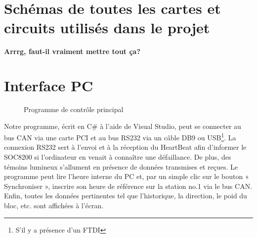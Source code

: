 \documentclass[10pt,a4paper,final]{article}
\begin{document}
\begin{spacing}{1.5}



\pagebreak
\section{Schémas de toutes les cartes et circuits utilisés dans le projet}

\textbf{{\Huge Arrrg, faut-il vraiment mettre tout ça?}}

\pagebreak
  
 

\section{Interface PC}

\begin{figure}[hbtp]
\caption{Programme de contrôle principal}
\centering
{}
\end{figure}

Notre programme, écrit en C\# à l'aide de Visual Studio, peut se connecter au bus CAN via une carte PCI et au bus RS232 via un câble DB9 ou USB\footnote{S'il y a présence d'un FTDI}. La connexion RS232 sert à l'envoi et à la réception du HeartBeat afin d'informer le SOC8200 si l'ordinateur en venait à connaître une défaillance. De plus, des témoins lumineux s'allument en présence de données transmises et reçues. Le programme peut lire l'heure interne du PC et, par un simple clic sur le bouton « Synchroniser », inscrire son heure de référence sur la station no.1 via le bus CAN. Enfin, toutes les données pertinentes tel que l'historique, la direction, le poid du bloc, etc. sont affichées à l'écran.\\


\end{spacing}
\end{document}
